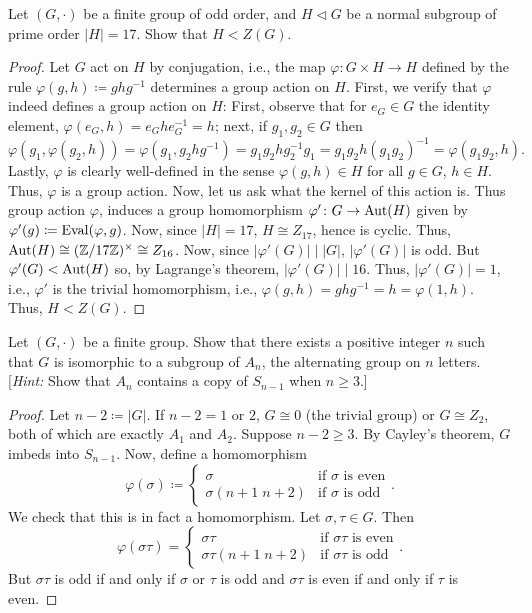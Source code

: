 \begin{problem}
Let $(G,\cdot)$ be a finite group of odd order, and $H\lhd G$ be a normal
subgroup of prime order $|H|=17$. Show that $H<Z(G)$.
\end{problem}
\begin{proof}
Let $G$ act on $H$ by conjugation, i.e., the map $\varphi\colon G\times
H\to H$ defined by the rule $\varphi(g,h)\coloneqq ghg^{-1}$ determines a
group action on $H$. First, we verify that $\varphi$ indeed defines a group
action on $H$: First, observe that for $e_G\in G$ the identity element,
$\varphi(e_G,h)=e_Ghe_G^{-1}=h$; next, if $g_1,g_2\in G$ then
\[
\varphi(g_1,\varphi(g_2,h))=\varphi(g_1,g_2hg^{-1})=g_1g_2hg_2^{-1}g_1=g_1g_2h(g_1g_2)^{-1}=\varphi(g_1g_2,h).
\]
Lastly, $\varphi$ is clearly well-defined in the sense $\varphi(g,h)\in H$
for all $g\in G$, $h\in H$. Thus, $\varphi$ is a group action. Now, let us
ask what the kernel of this action is. Thus group action $\varphi$, induces
a group homomorphism $\varphi'\colon G\to\operatorname{Aut}(H)$ given by
$\varphi'(g)\coloneqq\operatorname{Eval}(\varphi,g)$. Now, since $|H|=17$, $H\cong
Z_{17}$, hence is cyclic. Thus, $\operatorname{Aut}(H)\cong(\mathbb{Z}/17\mathbb{Z})^{\times}\cong
Z_{16}$. Now, since $|\varphi'(G)|\mid |G|$, $|\varphi'(G)|$ is odd. But
$\varphi'(G)<\operatorname{Aut}(H)$ so, by Lagrange's theorem, $|\varphi'(G)|\mid
16$. Thus, $|\varphi'(G)|=1$, i.e., $\varphi'$ is the trivial homomorphism,
i.e., $\varphi(g,h)=ghg^{-1}=h=\varphi(1,h)$. Thus, $H<Z(G)$.
\end{proof}
\begin{problem}
Let $(G,\cdot)$ be a finite group. Show that there exists a positive
integer $n$ such that $G$ is isomorphic to a subgroup of $A_n$, the
alternating group on $n$ letters. [\emph{Hint:} Show that $A_n$ contains a
copy of $S_{n-1}$ when $n\geq 3$.]
\end{problem}
\begin{proof}
Let $n-2\coloneqq |G|$. If $n-2=1$ or $2$, $G\cong 0$ (the trivial group) or
$G\cong Z_2$, both of which are exactly $A_1$ and $A_2$. Suppose $n-2\geq
3$. By Cayley's theorem, $G$ imbeds into $S_{n-1}$. Now, define a
homomorphism
\[
\varphi(\sigma)\coloneqq
\begin{cases}
\sigma&\text{if $\sigma$ is even}\\
\sigma(n+1\;n+2)&\text{if $\sigma$ is odd}
\end{cases}.
\]
We check that this is in fact a homomorphism. Let $\sigma,\tau\in G$. Then
\[
\varphi(\sigma\tau)=
\begin{cases}
\sigma\tau&\text{if $\sigma\tau$ is even}\\
\sigma\tau(n+1\;n+2)&\text{if $\sigma\tau$ is odd}
\end{cases}.
\]
But $\sigma\tau$ is odd if and only if $\sigma$ or $\tau$ is odd and
$\sigma\tau$ is even if and only if $\tau$ is even.
\end{proof}

